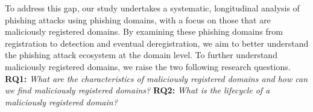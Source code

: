 To address this gap, our study undertakes a systematic, longitudinal analysis of phishing attacks using phishing domains, with a focus on those that are maliciously registered domains. 
By examining these phishing domains from registration to detection and eventual deregistration, we aim to better understand the phishing attack ecosystem at the domain level. 
% 
To further understand maliciously registered domains, we raise the two following research questions.
\textbf{RQ1:} \textit{What are the characteristics of maliciously registered domains and how can we find maliciously registered domains?}
\textbf{RQ2:} \textit{What is the lifecycle of a maliciously registered domain?}


